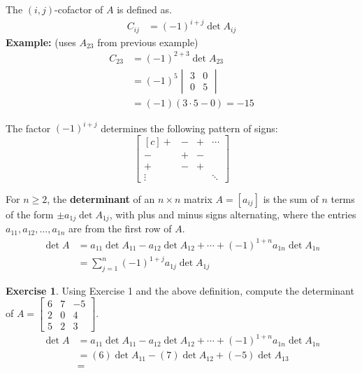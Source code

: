 \documentclass[10pt]{book}
\newcommand{\boxcolor}{gray!30}
\newenvironment{boxme}{\begin{mdframed}[backgroundcolor=\boxcolor,linewidth=0pt,nobreak=true]}{\end{mdframed}}
\newenvironment{boxdef}{\begin{mdframed}[backgroundcolor=\boxcolor,linewidth=0pt,nobreak=true]}{\end{mdframed}}
\theoremstyle{definition}
\newtheorem{exercise}{Exercise}[section]
\begin{document}
\begin{boxme}
	\vspace{-1em}
	\begin{multicols}{2}
		The $(i,j)$-cofactor of $A$ is defined as.
		\begin{align*}
		C_{ij} &= (-1)^{i+j}\det A_{ij}
		\end{align*}
		\textbf{Example:} (uses $A_{23}$ from previous example)
		\begin{align*}
		C_{23} &= (-1)^{2+3}\det A_{23} \\
		&= (-1)^5\begin{vmatrix} 3&0 \\ 0&5 \end{vmatrix} \\
		&= (-1)(3\cdot 5 - 0) = -15
		\end{align*}
		
		\columnbreak
		
		The factor $(-1)^{i+j}$ determines the following pattern of signs:
		$$\begin{bmatrix}[c] +&-&+&\cdots \\ -&+&-& \\ +&-&+& \\ \vdots&&&\ddots \end{bmatrix}$$
	\end{multicols}
\end{boxme}
\begin{boxdef}
	For $n\geq 2$, the \textbf{determinant} of an $n\times n$ matrix $A=[a_{ij}]$ is the sum of $n$ terms of the form $\pm a_{1j}\det A_{1j}$, with plus and minus signs alternating, where the entries $a_{11},a_{12},\ldots,a_{1n}$ are from the first row of $A$. 
	\begin{align*}
	\det A &= a_{11}\det A_{11} - a_{12}\det A_{12} + \cdots + (-1)^{1+n}a_{1n}\det A_{1n} \\
	&= \sum_{j=1}^n(-1)^{1+j}a_{1j}\det A_{1j}
	\end{align*}
\end{boxdef}
\begin{exercise} %
	Using Exercise 1 and the above definition, compute the determinant of $A=\begin{bmatrix}6&7&-5\\2&0&4\\5&2&3\end{bmatrix}$.
	\vspace{-1ex}
	\begin{align*}
	\det A &= a_{11}\det A_{11} - a_{12}\det A_{12} + \cdots + (-1)^{1+n}a_{1n}\det A_{1n} \\
	&= (6)\det A_{11} - (7)\det A_{12} + (-5)\det A_{13} \\[1em]
	&=
	\end{align*}
\end{exercise}
\vfill
\end{document}
